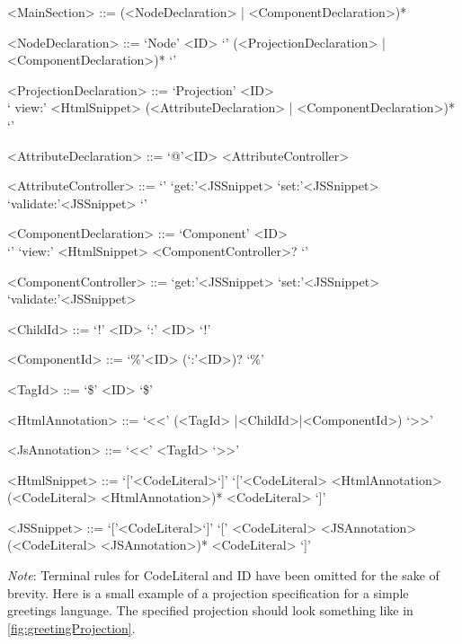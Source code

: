 \documentclass{article}
\begin{document}
{\begin{grammar}
<MainSection> ::= (<NodeDeclaration> | <ComponentDeclaration>)*

<NodeDeclaration> ::= `Node' <ID> `{' (<ProjectionDeclaration> | <ComponentDeclaration>)* `}'

<ProjectionDeclaration> ::= `Projection' <ID> \\ `{ view:' <HtmlSnippet> (<AttributeDeclaration> | <ComponentDeclaration>)* `}'

<AttributeDeclaration> ::= `@'<ID> <AttributeController>

<AttributeController> ::= `{' `get:'<JSSnippet> `set:'<JSSnippet> `validate:'<JSSnippet> `}'

<ComponentDeclaration> ::= `Component' <ID> \\`{' `view:' <HtmlSnippet> <ComponentController>? `}'

<ComponentController> ::= `get:'<JSSnippet> `set:'<JSSnippet> `validate:'<JSSnippet> 
 
<ChildId> ::= `!' <ID> `:' <ID> `!'
 
<ComponentId> ::= `\%'<ID> (`:'<ID>)? `\%'

<TagId> ::= `\$' <ID> `\$' 

<HtmlAnnotation> ::= `<<' (<TagId> |<ChildId>|<ComponentId>) `>>'

<JsAnnotation> ::= `<<' <TagId> `>>'

<HtmlSnippet> ::= `['<CodeLiteral>`]'
\alt `['<CodeLiteral> <HtmlAnnotation> (<CodeLiteral> <HtmlAnnotation>)*  <CodeLiteral> `]'

<JSSnippet> ::= `['<CodeLiteral>`]'
\alt `[' <CodeLiteral> <JSAnnotation> (<CodeLiteral> <JSAnnotation>)*  <CodeLiteral> `]'


\end{grammar}

\emph{Note}: Terminal rules for CodeLiteral and ID have been omitted for the sake of brevity.
Here is a small example of a projection specification for a simple greetings language. The specified projection should look something like in \ref{fig:greetingProjection}.
}
\end{document}
